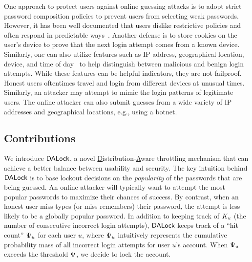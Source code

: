 One approach to protect users against online guessing attacks is to adopt strict password composition policies to prevent users from selecting weak passwords. However, it has been well documented that users dislike restrictive policies and often respond in predictable ways~\cite{KSKMBCCE:SIGCHI11}. Another defense is to store cookies on the user's device to prove that the next login attempt comes from a known device. Similarly, one can also utilize features such as IP address, geographical location, device, and time of day~\cite{sandhu2005system,gordon2014efficiently,NDSS:FJDBG16} to help distinguish between malicious and benign login attempts. While these features can be helpful indicators, they are not failproof. Honest users oftentimes travel and login from different devices at unusual times. Similarly, an attacker may attempt to mimic the login patterns of legitimate users. The online attacker can also submit guesses from a wide variety of IP addresses and geographical locations, e.g., using a botnet. 




\vspace{-0.1cm}


\subsection{Contributions} 


We introduce $\mathsf{DALock}$, a novel \underline{D}istribution-\underline{A}ware throttling mechanism that can achieve a better balance between usability and security. The key intuition behind $\mathsf{DALock}$ is to base lockout decisions on the {\em popularity} of the passwords that are being guessed. An online attacker will typically want to attempt the most popular passwords to maximize their chances of success. By contrast, when an honest user miss-types (or miss-remembers) their password, the attempt is less likely to be a globally popular password. In addition to keeping track of $K_{u}$ (the number of consecutive incorrect login attempts), $\mathsf{DALock}$ keeps track of a ``hit count'' $\Psi_{u}$ for each user $u$, where $\Psi_{u}$ intuitively represents the cumulative probability mass of all incorrect login attempts for user $u$'s account. When $\Psi_{u}$ exceeds the threshold $\Psi$, we decide to lock the account. 



